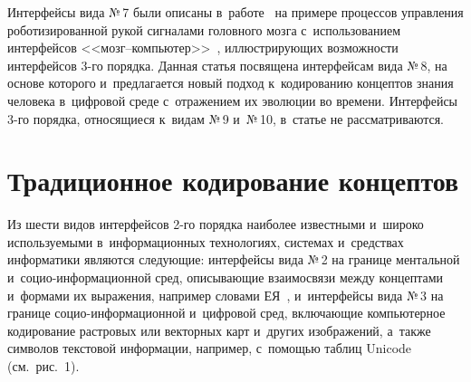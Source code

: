 \begin{multicols}{2}
  Интерфейсы вида №\,7 были описаны в~работе~\cite{2-zac} на примере 
процессов управления роботизированной рукой сигналами головного мозга 
с~использованием интерфейсов <<мозг--ком\-пью\-тер>>~\cite{11-zac, 12-zac}, 
иллюстрирующих возможности интерфейсов 3-го порядка. Данная статья 
посвящена интерфейсам вида №\,8, на основе которого и~предлагается новый 
подход к~кодированию концептов знания человека в~цифровой среде 
с~отражением их эволюции во времени. Интерфейсы 3-го порядка, 
относящиеся к~видам №\,9 и~№\,10, в~статье не рассматриваются.
  
\section{Традиционное кодирование концептов}

  Из шести видов интерфейсов 2-го порядка наиболее известными и~широко используемыми в~информационных технологиях, системах и~средствах информатики являются 
следующие: интерфейсы вида №\,2 на границе ментальной  
и~со\-цио-ин\-фор\-ма\-ци\-он\-ной сред, описывающие взаимосвязи между 
концептами и~формами их выражения, например словами 
ЕЯ~\cite{10-zac}, и~интерфейсы вида №\,3 на границе  
со\-цио-ин\-фор\-ма\-ци\-он\-ной и~цифровой сред, включающие компьютерное 
кодирование растровых или векторных карт и~других изображений, а~также 
символов текстовой информации, например, с~помощью таблиц Unicode 
(см.\ рис.~1).
  

\end{multicols}
